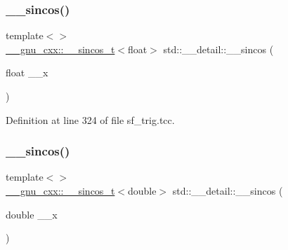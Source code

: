 \mbox{\label{namespacestd_1_1____detail_a8cfd8b8345ebc359e31ac1631e29aeea}} 
\subsubsection{\texorpdfstring{\+\_\+\+\_\+sincos()}{\_\_sincos()}\hspace{0.1cm}{\footnotesize\ttfamily [2/4]}}
{\footnotesize\ttfamily template$<$$>$ \\
\hyperlink{struct____gnu__cxx_1_1____sincos__t}{\+\_\+\+\_\+gnu\+\_\+cxx\+::\+\_\+\+\_\+sincos\+\_\+t}$<$float$>$ std\+::\+\_\+\+\_\+detail\+::\+\_\+\+\_\+sincos (\begin{DoxyParamCaption}\item[{float}]{\+\_\+\+\_\+x }\end{DoxyParamCaption})\hspace{0.3cm}{\ttfamily [inline]}}



Definition at line 324 of file sf\+\_\+trig.\+tcc.

\mbox{\label{namespacestd_1_1____detail_a76c185b3a0156ecf557afdbf552a8916}} 
\subsubsection{\texorpdfstring{\+\_\+\+\_\+sincos()}{\_\_sincos()}\hspace{0.1cm}{\footnotesize\ttfamily [3/4]}}
{\footnotesize\ttfamily template$<$$>$ \\
\hyperlink{struct____gnu__cxx_1_1____sincos__t}{\+\_\+\+\_\+gnu\+\_\+cxx\+::\+\_\+\+\_\+sincos\+\_\+t}$<$double$>$ std\+::\+\_\+\+\_\+detail\+::\+\_\+\+\_\+sincos (\begin{DoxyParamCaption}\item[{double}]{\+\_\+\+\_\+x }\end{DoxyParamCaption})\hspace{0.3cm}{\ttfamily [inline]}}



